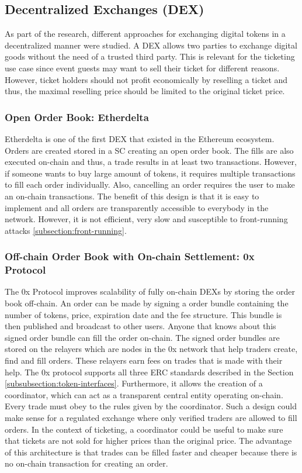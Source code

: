 
\subsection{Decentralized Exchanges (DEX)}\label{subsection:dex}

As part of the research, different approaches for exchanging digital tokens in a decentralized manner were studied. A DEX allows two parties to exchange digital goods without the need of a trusted third party. This is relevant for the ticketing use case since event guests may want to sell their ticket for different reasons. However, ticket holders should not profit economically by reselling a ticket and thus, the maximal reselling price should be limited to the original ticket price. 

\subsubsection{Open Order Book: Etherdelta}
Etherdelta is one of the first DEX that existed in the Ethereum ecosystem. Orders are created stored in a SC creating an open order book. The fills are also executed on-chain and thus, a trade results in at least two transactions. However, if someone wants to buy large amount of tokens, it requires multiple transactions to fill each order individually. Also, cancelling an order requires the user to make an on-chain transactions. The benefit of this design is that it is easy to implement and all orders are transparently accessible to everybody in the network. However, it is not efficient, very slow and susceptible to front-running attacks \ref{subsection:front-running}. 

\subsubsection{Off-chain Order Book with On-chain Settlement: 0x Protocol}

The 0x Protocol improves scalability of fully on-chain DEXs by storing the order book off-chain. An order can be made by signing a order bundle containing the number of tokens, price, expiration date and the fee structure. This bundle is then published and broadcast to other users. Anyone that knows about this signed order bundle can fill the order on-chain. The signed order bundles are stored on the relayers which are nodes in the 0x network that help traders create, find and fill orders. These relayers earn fees on trades that is made with their help. The 0x protocol supports all three ERC standards described in the Section \ref{subsubsection:token-interfaces}. Furthermore, it allows the creation of a coordinator, which can act as a transparent central entity operating on-chain. Every trade must obey to the rules given by the coordinator. Such a design could make sense for a regulated exchange where only verified traders are allowed to fill orders. In the context of ticketing, a coordinator could be useful to make sure that tickets are not sold for higher prices than the original price. The advantage of this architecture is that trades can be filled faster and cheaper because there is no on-chain transaction for creating an order.


